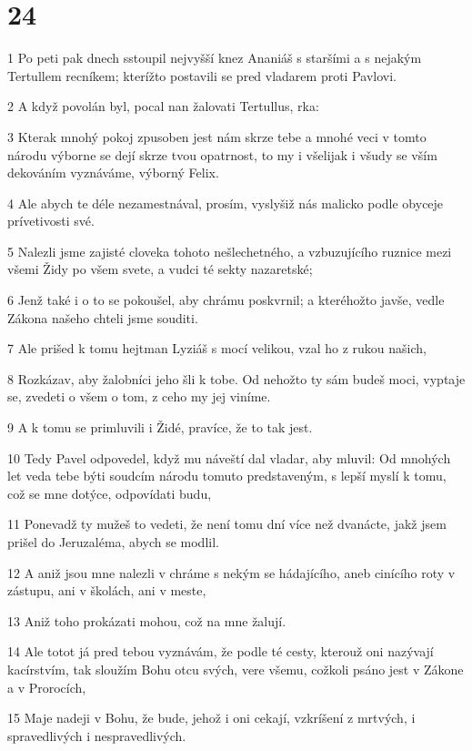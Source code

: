 \chapter{24}

\par 1 Po peti pak dnech sstoupil nejvyšší knez Ananiáš s staršími a s nejakým Tertullem recníkem; kterížto postavili se pred vladarem proti Pavlovi.
\par 2 A když povolán byl, pocal nan žalovati Tertullus, rka:
\par 3 Kterak mnohý pokoj zpusoben jest nám skrze tebe a mnohé veci v tomto národu výborne se dejí skrze tvou opatrnost, to my i všelijak i všudy se vším dekováním vyznáváme, výborný Felix.
\par 4 Ale abych te déle nezamestnával, prosím, vyslyšiž nás malicko podle obyceje prívetivosti své.
\par 5 Nalezli jsme zajisté cloveka tohoto nešlechetného, a vzbuzujícího ruznice mezi všemi Židy po všem svete, a vudci té sekty nazaretské;
\par 6 Jenž také i o to se pokoušel, aby chrámu poskvrnil; a kteréhožto javše, vedle Zákona našeho chteli jsme souditi.
\par 7 Ale prišed k tomu hejtman Lyziáš s mocí velikou, vzal ho z rukou našich,
\par 8 Rozkázav, aby žalobníci jeho šli k tobe. Od nehožto ty sám budeš moci, vyptaje se, zvedeti o všem o tom, z ceho my jej viníme.
\par 9 A k tomu se primluvili i Židé, pravíce, že to tak jest.
\par 10 Tedy Pavel odpovedel, když mu náveští dal vladar, aby mluvil: Od mnohých let veda tebe býti soudcím národu tomuto predstaveným, s lepší myslí k tomu, což se mne dotýce, odpovídati budu,
\par 11 Ponevadž ty mužeš to vedeti, že není tomu dní více než dvanácte, jakž jsem prišel do Jeruzaléma, abych se modlil.
\par 12 A aniž jsou mne nalezli v chráme s nekým se hádajícího, aneb cinícího roty v zástupu, ani v školách, ani v meste,
\par 13 Aniž toho prokázati mohou, což na mne žalují.
\par 14 Ale totot já pred tebou vyznávám, že podle té cesty, kterouž oni nazývají kacírstvím, tak sloužím Bohu otcu svých, vere všemu, cožkoli psáno jest v Zákone a v Prorocích,
\par 15 Maje nadeji v Bohu, že bude, jehož i oni cekají, vzkríšení z mrtvých, i spravedlivých i nespravedlivých.
